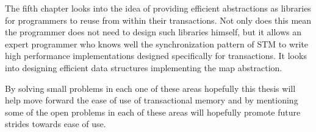The fifth chapter looks into the idea of providing efficient abstractions
as libraries for programmers to reuse from within their transactions.
Not only does this mean the programmer does not need to design such libraries himself, but
it allows an expert programmer who knows well the synchronization pattern of STM
to write high performance implementations designed specifically for transactions.
It looks into designing efficient data structures implementing the map abstraction.


By solving small problems in each one of these areas hopefully this thesis will
help move forward the ease of use of transactional memory and by mentioning
some of the open problems in each of these areas will hopefully promote
future strides towards ease of use.




